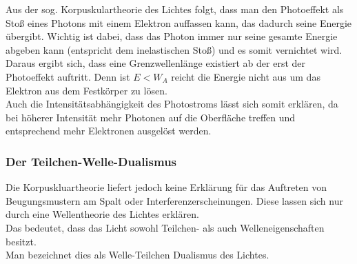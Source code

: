 Aus der sog. Korpuskulartheorie des Lichtes folgt, dass man den Photoeffekt als Stoß eines Photons mit einem Elektron auffassen kann, das dadurch seine Energie übergibt. Wichtig ist dabei, dass das Photon immer nur seine gesamte Energie abgeben kann (entspricht dem inelastischen Stoß) und es somit vernichtet wird.\\
Daraus ergibt sich, dass eine Grenzwellenlänge existiert ab der erst der Photoeffekt auftritt. Denn ist $E < W_A$ reicht die Energie nicht aus um das Elektron aus dem Festkörper zu lösen.\\
Auch die Intensitätsabhängigkeit des Photostroms lässt sich somit erklären, da bei höherer Intensität mehr Photonen auf die Oberfläche treffen und entsprechend mehr Elektronen ausgelöst werden.\\

\subsubsection{Der Teilchen-Welle-Dualismus}
Die Korpuskluartheorie liefert jedoch keine Erklärung für das Auftreten von Beugungsmustern am Spalt oder Interferenzerscheinungen. Diese lassen 
sich nur durch eine Wellentheorie des Lichtes erklären.\\
Das bedeutet, dass das Licht sowohl Teilchen- als auch Welleneigenschaften besitzt.\\
Man bezeichnet dies als Welle-Teilchen Dualismus des Lichtes.
